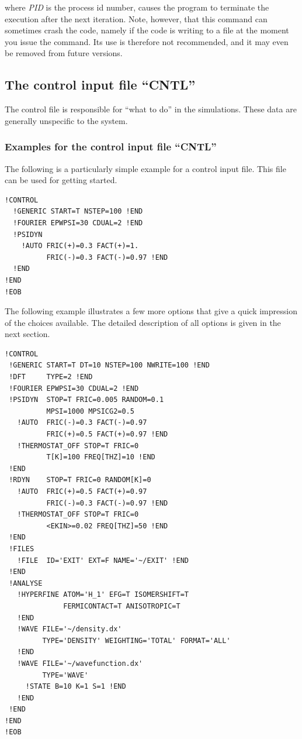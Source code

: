 \documentclass[final,12pt]{article}
\begin{document}
\noindent where {\it PID} is the process id number, causes the program to
terminate the execution after the next iteration. Note, however, that
this command can sometimes crash the code, namely if the code is
writing to a file at the moment you issue the command.  Its use is
therefore not recommended, and it may even be removed from future
versions.

%
\subsection{The control input file ``CNTL''}

The control file is responsible for ``what to do'' in the
simulations. These data are generally unspecific to the system.

\subsubsection{Examples for the control input file ``CNTL''}
The following is a particularly simple example for a control input
file. This file can be used for getting started.

\begin{verbatim}
!CONTROL
  !GENERIC START=T NSTEP=100 !END   
  !FOURIER EPWPSI=30 CDUAL=2 !END
  !PSIDYN  
    !AUTO FRIC(+)=0.3 FACT(+)=1. 
          FRIC(-)=0.3 FACT(-)=0.97 !END
  !END
!END         
!EOB
\end{verbatim}

The following example illustrates a few more options that give a quick
impression of the choices available. The detailed description of all
options is given in the next section.

\begin{verbatim}
!CONTROL
 !GENERIC START=T DT=10 NSTEP=100 NWRITE=100 !END   
 !DFT     TYPE=2 !END
 !FOURIER EPWPSI=30 CDUAL=2 !END
 !PSIDYN  STOP=T FRIC=0.005 RANDOM=0.1 
          MPSI=1000 MPSICG2=0.5 
   !AUTO  FRIC(-)=0.3 FACT(-)=0.97 
          FRIC(+)=0.5 FACT(+)=0.97 !END
   !THERMOSTAT_OFF STOP=T FRIC=0 
          T[K]=100 FREQ[THZ]=10 !END 
 !END
 !RDYN    STOP=T FRIC=0 RANDOM[K]=0 
   !AUTO  FRIC(+)=0.5 FACT(+)=0.97 
          FRIC(-)=0.3 FACT(-)=0.97 !END
   !THERMOSTAT_OFF STOP=T FRIC=0 
          <EKIN>=0.02 FREQ[THZ]=50 !END
 !END
 !FILES
   !FILE  ID='EXIT' EXT=F NAME='~/EXIT' !END
 !END
 !ANALYSE 
   !HYPERFINE ATOM='H_1' EFG=T ISOMERSHIFT=T 
              FERMICONTACT=T ANISOTROPIC=T
   !END
   !WAVE FILE='~/density.dx'
         TYPE='DENSITY' WEIGHTING='TOTAL' FORMAT='ALL'
   !END
   !WAVE FILE='~/wavefunction.dx'
         TYPE='WAVE' 
     !STATE B=10 K=1 S=1 !END
   !END
 !END
!END
!EOB
\end{verbatim}
\end{document}
